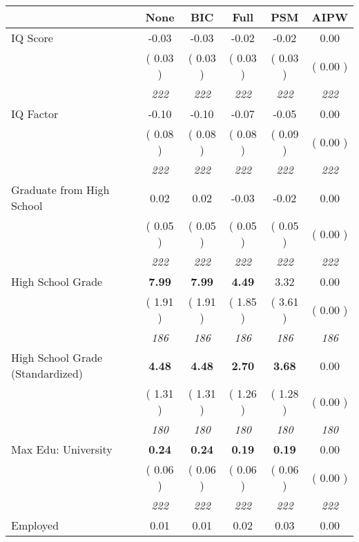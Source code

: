 \begin{tabular}{l c c c c c}
\toprule
 & None & BIC & Full & PSM & AIPW \\
\midrule
IQ Score &     -0.03 &     -0.03 &     -0.02 &     -0.02 &      0.00 \\
& (     0.03 ) & (     0.03 ) & (     0.03 ) & (     0.03 ) & (     0.00 ) \\
& \textit{ 222 } & \textit{ 222 } & \textit{ 222 } & \textit{ 222 } & \textit{ 222 } \\
IQ Factor &     -0.10 &     -0.10 &     -0.07 &     -0.05 &      0.00 \\
& (     0.08 ) & (     0.08 ) & (     0.08 ) & (     0.09 ) & (     0.00 ) \\
& \textit{ 222 } & \textit{ 222 } & \textit{ 222 } & \textit{ 222 } & \textit{ 222 } \\
Graduate from High School &      0.02 &      0.02 &     -0.03 &     -0.02 &      0.00 \\
& (     0.05 ) & (     0.05 ) & (     0.05 ) & (     0.05 ) & (     0.00 ) \\
& \textit{ 222 } & \textit{ 222 } & \textit{ 222 } & \textit{ 222 } & \textit{ 222 } \\
High School Grade & \textbf{      7.99 } & \textbf{      7.99 } & \textbf{      4.49 } &      3.32 &      0.00 \\
& (     1.91 ) & (     1.91 ) & (     1.85 ) & (     3.61 ) & (     0.00 ) \\
& \textit{ 186 } & \textit{ 186 } & \textit{ 186 } & \textit{ 186 } & \textit{ 186 } \\
High School Grade (Standardized) & \textbf{      4.48 } & \textbf{      4.48 } & \textbf{      2.70 } & \textbf{     3.68} &      0.00 \\
& (     1.31 ) & (     1.31 ) & (     1.26 ) & (     1.28 ) & (     0.00 ) \\
& \textit{ 180 } & \textit{ 180 } & \textit{ 180 } & \textit{ 180 } & \textit{ 180 } \\
Max Edu: University & \textbf{      0.24 } & \textbf{      0.24 } & \textbf{      0.19 } & \textbf{     0.19} &      0.00 \\
& (     0.06 ) & (     0.06 ) & (     0.06 ) & (     0.06 ) & (     0.00 ) \\
& \textit{ 222 } & \textit{ 222 } & \textit{ 222 } & \textit{ 222 } & \textit{ 222 } \\
Employed &      0.01 &      0.01 &      0.02 &      0.03 &      0.00 \\

\end{tabular}
